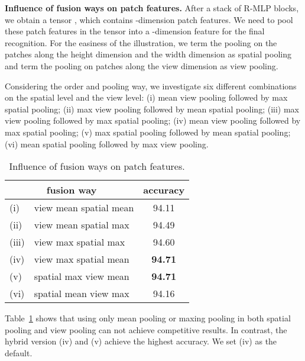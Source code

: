\documentclass[11pt]{article}
\begin{document}
\vspace{0.2in}\noindent\textbf{Influence of fusion ways on patch features.}
After a stack of  R-MLP blocks, we obtain a tensor , which contains  -dimension patch features. We need to pool these patch features in the tensor into a -dimension feature for the final recognition. For the easiness of the illustration, we term the pooling on the patches along the height dimension and the width dimension as spatial pooling and term the pooling on patches along the view dimension as view pooling.

Considering the order and pooling way, we investigate six different combinations on the spatial level and the view level: (i) mean view pooling followed by max spatial pooling; (ii)  max view pooling followed by mean spatial pooling; (iii) max view pooling followed by max spatial pooling; (iv) mean view pooling followed by max spatial pooling; (v) max spatial pooling followed by mean spatial pooling; (vi) mean spatial pooling followed by max view pooling.




\begin{table}[ht]
\caption{Influence of fusion ways on patch features.}
\label{tab:pool}
\centering
\begin{tabular}{l@{}lc}
\toprule
\multicolumn{2}{c}{fusion way} & accuracy \\
\midrule
(i) & view mean  spatial mean & 94.11 \\
(ii) & view mean  spatial max & 94.49 \\
(iii) & view max  spatial max & 94.60 \\
(iv) & view max  spatial mean & \textbf{94.71} \\
(v) & spatial max  view mean & \textbf{94.71} \\
(vi) & spatial mean  view max & 94.16 \\
\bottomrule
\end{tabular}
\end{table}

Table~\ref{tab:pool} shows that using only mean pooling or maxing pooling in both spatial pooling and view pooling can not achieve competitive results. In contrast, the hybrid version (iv) and (v) achieve the highest accuracy. We set (iv) as the default.
\end{document}
